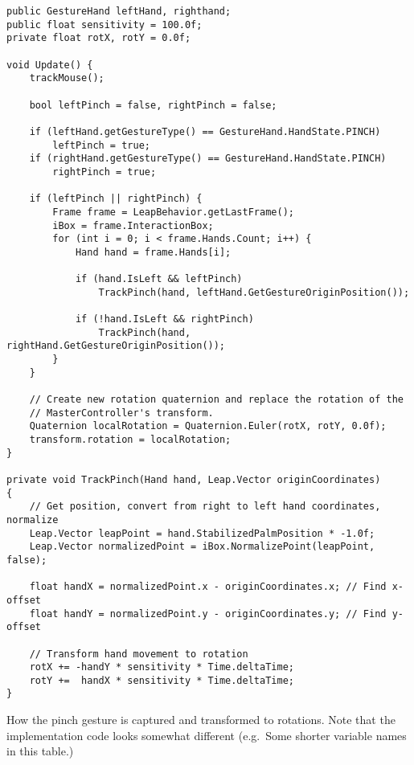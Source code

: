 \begin{table}
\label{table:rotation_gesture_code}
\lstset{style=csharp}
\begin{lstlisting}
public GestureHand leftHand, righthand; 
public float sensitivity = 100.0f;
private float rotX, rotY = 0.0f;

void Update() {
    trackMouse();

    bool leftPinch = false, rightPinch = false;
    
    if (leftHand.getGestureType() == GestureHand.HandState.PINCH)
        leftPinch = true;
    if (rightHand.getGestureType() == GestureHand.HandState.PINCH)
        rightPinch = true;

    if (leftPinch || rightPinch) {
        Frame frame = LeapBehavior.getLastFrame();
        iBox = frame.InteractionBox;
        for (int i = 0; i < frame.Hands.Count; i++) {
            Hand hand = frame.Hands[i];

            if (hand.IsLeft && leftPinch)
                TrackPinch(hand, leftHand.GetGestureOriginPosition());

            if (!hand.IsLeft && rightPinch)
                TrackPinch(hand, rightHand.GetGestureOriginPosition());
        }
    }
    
    // Create new rotation quaternion and replace the rotation of the 
    // MasterController's transform. 
    Quaternion localRotation = Quaternion.Euler(rotX, rotY, 0.0f);
    transform.rotation = localRotation;         
}

private void TrackPinch(Hand hand, Leap.Vector originCoordinates)
{       
    // Get position, convert from right to left hand coordinates, normalize
    Leap.Vector leapPoint = hand.StabilizedPalmPosition * -1.0f;
    Leap.Vector normalizedPoint = iBox.NormalizePoint(leapPoint, false);

    float handX = normalizedPoint.x - originCoordinates.x; // Find x-offset
    float handY = normalizedPoint.y - originCoordinates.y; // Find y-offset

    // Transform hand movement to rotation
    rotX += -handY * sensitivity * Time.deltaTime;
    rotY +=  handX * sensitivity * Time.deltaTime;
}                                                                                  
\end{lstlisting}
\caption[How the pinch gesture is captured and transformed to rotations]{How the pinch gesture is captured and transformed to rotations. 
            Note that the implementation code looks somewhat different (e.g.~Some shorter variable names in this table.)} 
\end{table}

